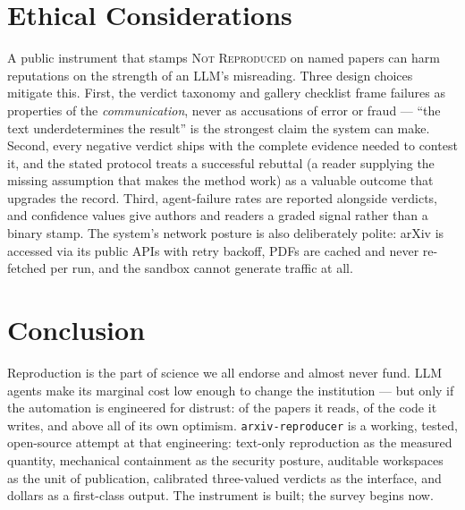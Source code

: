 \documentclass[10pt]{article}
\newcommand{\system}{\texttt{arxiv-reproducer}}
\newcommand{\verdict}[1]{\textsc{#1}}
\begin{document}
\section{Ethical Considerations}\label{sec:ethics}

A public instrument that stamps \verdict{Not Reproduced} on named papers can harm reputations on the strength of an LLM's misreading. Three design choices mitigate this. First, the verdict taxonomy and gallery checklist frame failures as properties of the \emph{communication}, never as accusations of error or fraud --- ``the text underdetermines the result'' is the strongest claim the system can make. Second, every negative verdict ships with the complete evidence needed to contest it, and the stated protocol treats a successful rebuttal (a reader supplying the missing assumption that makes the method work) as a valuable outcome that upgrades the record. Third, agent-failure rates are reported alongside verdicts, and confidence values give authors and readers a graded signal rather than a binary stamp. The system's network posture is also deliberately polite: arXiv is accessed via its public APIs with retry backoff, PDFs are cached and never re-fetched per run, and the sandbox cannot generate traffic at all.

\section{Conclusion}

Reproduction is the part of science we all endorse and almost never fund. LLM agents make its marginal cost low enough to change the institution --- but only if the automation is engineered for distrust: of the papers it reads, of the code it writes, and above all of its own optimism. \system{} is a working, tested, open-source attempt at that engineering: text-only reproduction as the measured quantity, mechanical containment as the security posture, auditable workspaces as the unit of publication, calibrated three-valued verdicts as the interface, and dollars as a first-class output. The instrument is built; the survey begins now.
\end{document}
